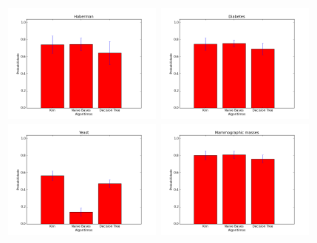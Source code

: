\documentclass[12pt, a4paper, brazil]{article}
\begin{document}
\begin{landscape}
\begin{figure}[!htb]
    \includegraphics[width=0.35\textwidth]{Habermans_Survival/acuracias.png}    
    \includegraphics[width=0.35\textwidth]{Pima_Indians_Diabetes/acuracias.png}
    \includegraphics[width=0.35\textwidth]{Yeast/acuracias.png}
    \includegraphics[width=0.35\textwidth]{Mammographic_Mass/acuracias.png}
            
\end{figure}
\end{landscape}
\end{document}
